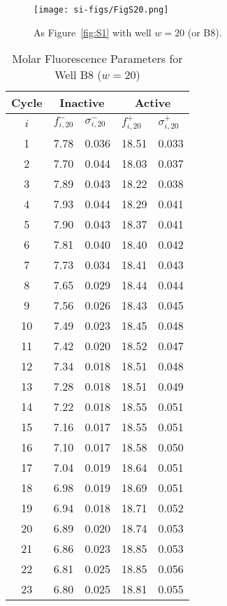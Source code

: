                 \begin{figure}
                    \centering
                    \texttt{[image: si-figs/FigS20.png]}
                    \caption{
                        As Figure~\ref{fig:S1} with well $w=20$ (or B8).
                    }
                \end{figure}
                \clearpage
    \begin{table}
        \caption{Molar Fluorescence Parameters for Well B8 ($w=20$)}
        \centering
        \begin{tabular}{c|ll|ll}
            Cycle & \multicolumn{2}{c|}{Inactive} & \multicolumn{2}{c}{Active} \\
            \hline
            $i$ & $f_{i,20}^{-}$ & $\sigma_{i,20}^{-}$ &  $f_{i,20}^{+}$ & $\sigma_{i,20}^{+}$ \\
            \hline
    1 & 7.78 & 0.036 & 18.51 & 0.033 \\
2 & 7.70 & 0.044 & 18.03 & 0.037 \\
3 & 7.89 & 0.043 & 18.22 & 0.038 \\
4 & 7.93 & 0.044 & 18.29 & 0.041 \\
5 & 7.90 & 0.043 & 18.37 & 0.041 \\
6 & 7.81 & 0.040 & 18.40 & 0.042 \\
7 & 7.73 & 0.034 & 18.41 & 0.043 \\
8 & 7.65 & 0.029 & 18.44 & 0.044 \\
9 & 7.56 & 0.026 & 18.43 & 0.045 \\
10 & 7.49 & 0.023 & 18.45 & 0.048 \\
11 & 7.42 & 0.020 & 18.52 & 0.047 \\
12 & 7.34 & 0.018 & 18.51 & 0.048 \\
13 & 7.28 & 0.018 & 18.51 & 0.049 \\
14 & 7.22 & 0.018 & 18.55 & 0.051 \\
15 & 7.16 & 0.017 & 18.55 & 0.051 \\
16 & 7.10 & 0.017 & 18.58 & 0.050 \\
17 & 7.04 & 0.019 & 18.64 & 0.051 \\
18 & 6.98 & 0.019 & 18.69 & 0.051 \\
19 & 6.94 & 0.018 & 18.71 & 0.052 \\
20 & 6.89 & 0.020 & 18.74 & 0.053 \\
21 & 6.86 & 0.023 & 18.85 & 0.053 \\
22 & 6.81 & 0.025 & 18.85 & 0.056 \\
23 & 6.80 & 0.025 & 18.81 & 0.055 \\

\end{tabular}
\end{table}
